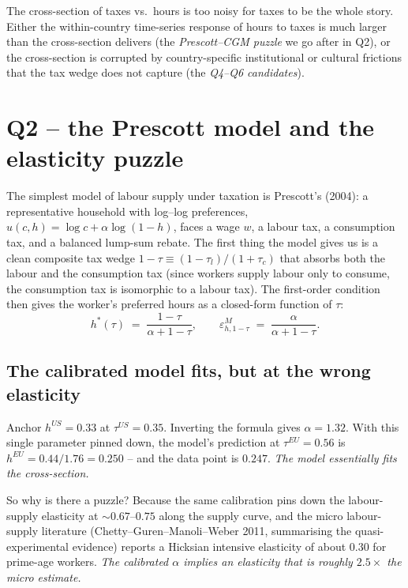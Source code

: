 \documentclass[11pt,a4paper]{article}
\begin{document}
The cross-section of taxes vs.\ hours is too noisy for taxes to be the
whole story. Either the within-country time-series response of hours
to taxes is much larger than the cross-section delivers (the
\emph{Prescott--CGM puzzle} we go after in Q2), or the cross-section
is corrupted by country-specific institutional or cultural frictions
that the tax wedge does not capture (the \emph{Q4--Q6 candidates}).

\section{Q2 -- the Prescott model and the elasticity puzzle}

The simplest model of labour supply under taxation is Prescott's
(2004): a representative household with log--log preferences,
$u(c,h)\!=\!\log c + \alpha\log(1-h)$, faces a wage $w$, a labour tax,
a consumption tax, and a balanced lump-sum rebate. The first thing the
model gives us is a clean composite tax wedge $1-\tau\!\equiv\!(1-\tau_l)/(1+\tau_c)$
that absorbs both the labour and the consumption tax (since workers
supply labour only to consume, the consumption tax is isomorphic to a
labour tax). The first-order condition then gives the worker's
preferred hours as a closed-form function of $\tau$:
\[
h^\ast(\tau)\;=\;\frac{1-\tau}{\alpha + 1-\tau},\qquad
\varepsilon^M_{h,1-\tau}\;=\;\frac{\alpha}{\alpha+1-\tau}.
\]

\subsection{The calibrated model fits, but at the wrong elasticity}

Anchor $h^{US}\!=\!0.33$ at $\tau^{US}\!=\!0.35$. Inverting the formula
gives $\alpha\!=\!1.32$. With this single parameter pinned down, the
model's prediction at $\tau^{EU}\!=\!0.56$ is $h^{EU}\!=\!0.44/1.76\!=\!0.250$
-- and the data point is $0.247$. \emph{The model essentially fits the
cross-section.}

So why is there a puzzle? Because the same calibration pins down the
labour-supply elasticity at $\sim 0.67$--$0.75$ along the supply curve,
and the micro labour-supply literature (Chetty--Guren--Manoli--Weber
2011, summarising the quasi-experimental evidence) reports a Hicksian
intensive elasticity of about $0.30$ for prime-age workers. \emph{The
calibrated $\alpha$ implies an elasticity that is roughly $2.5\times$
the micro estimate.}
\end{document}
